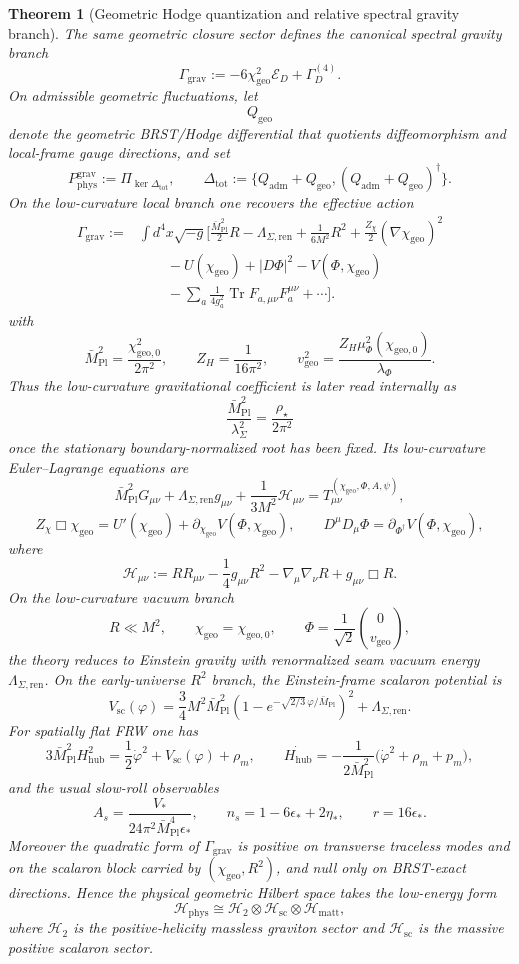 \documentclass[11pt,a4paper]{article}
\newtheorem{theorem}{Theorem}[section]
\theoremstyle{definition}
\theoremstyle{remark}
\DeclareMathOperator{\tr}{Tr}
\newcommand{\Seam}{\Sigma}
\newcommand{\Mpl}{\bar M_{\mathrm{Pl}}}
\newcommand{\Hhub}{H_{\mathrm{hub}}}
\newcommand{\chigeo}{\chi_{\mathrm{geo}}}
\newcommand{\chigeozero}{\chi_{\mathrm{geo},0}}
\newcommand{\vgeo}{v_{\mathrm{geo}}}
\begin{document}
\begin{theorem}[Geometric Hodge quantization and relative spectral gravity branch]
\label{thm:gravity-cosmology-closure}
The same geometric closure sector defines the canonical spectral gravity branch
\[
\Gamma_{\mathrm{grav}}
:=
-6\chigeo^2\mathcal E_D+\Gamma_D^{(4)}.
\]
On admissible geometric fluctuations, let
\[
Q_{\mathrm{geo}}
\]
denote the geometric BRST/Hodge differential that quotients diffeomorphism and local-frame gauge
directions, and set
\[
P_{\mathrm{phys}}^{\mathrm{grav}}
:=
\Pi_{\ker\Delta_{\mathrm{tot}}},
\qquad
\Delta_{\mathrm{tot}}
:=
\{Q_{\mathrm{adm}}+Q_{\mathrm{geo}},(Q_{\mathrm{adm}}+Q_{\mathrm{geo}})^\dagger\}.
\]
On the low-curvature local branch one recovers the effective action
\[
\begin{aligned}
\Gamma_{\mathrm{grav}}
:={}&
\int d^4x\sqrt{-g}\Big[
\frac{\Mpl^2}{2}R
-\Lambda_{\Seam,\mathrm{ren}}
+\frac{1}{6M^2}R^2
+\frac{Z_\chi}{2}(\nabla\chigeo)^2
\\
&\qquad
-U(\chigeo)
+|D\Phi|^2
-V(\Phi,\chigeo)
\\
&\qquad
-\sum_a \frac{1}{4g_a^2}\tr F_{a,\mu\nu}F_a^{\mu\nu}
+\cdots
\Big].
\end{aligned}
\]
with
\[
\Mpl^2=\frac{\chigeozero^2}{2\pi^2},
\qquad
Z_H=\frac{1}{16\pi^2},
\qquad
\vgeo^2=\frac{Z_H\mu_\Phi^2(\chigeozero)}{\lambda_\Phi}.
\]
Thus the low-curvature gravitational coefficient is later read internally as
\[
\frac{\Mpl^2}{\lambda_\Sigma^2}=\frac{\rho_\star}{2\pi^2}
\]
once the stationary boundary-normalized root has been fixed.
Its low-curvature Euler--Lagrange equations are
\[
\Mpl^2 G_{\mu\nu}
+\Lambda_{\Seam,\mathrm{ren}} g_{\mu\nu}
+\frac{1}{3M^2}\mathcal H_{\mu\nu}
=
T_{\mu\nu}^{(\chigeo,\Phi,A,\psi)},
\]
\[
Z_\chi\Box\chigeo=U'(\chigeo)+\partial_{\chigeo}V(\Phi,\chigeo),
\qquad
D^\mu D_\mu\Phi=\partial_{\Phi^\dagger}V(\Phi,\chigeo),
\]
where
\[
\mathcal H_{\mu\nu}
:=
RR_{\mu\nu}
-\frac14 g_{\mu\nu}R^2
-\nabla_\mu\nabla_\nu R
+g_{\mu\nu}\Box R.
\]
On the low-curvature vacuum branch
\[
R\ll M^2,
\qquad
\chigeo=\chigeozero,
\qquad
\Phi=\frac{1}{\sqrt2}\binom{0}{\vgeo},
\]
the theory reduces to Einstein gravity with renormalized seam vacuum energy $\Lambda_{\Seam,\mathrm{ren}}$.
On the early-universe $R^2$ branch, the Einstein-frame scalaron potential is
\[
V_{\mathrm{sc}}(\varphi)
=
\frac34 M^2\Mpl^2
\left(1-e^{-\sqrt{2/3}\,\varphi/\Mpl}\right)^2
+\Lambda_{\Seam,\mathrm{ren}}.
\]
For spatially flat FRW one has
\[
3\Mpl^2\Hhub^2
=
\frac12\dot\varphi^2+V_{\mathrm{sc}}(\varphi)+\rho_m,
\qquad
\dot{\Hhub}
=
-\frac{1}{2\Mpl^2}\bigl(\dot\varphi^2+\rho_m+p_m\bigr),
\]
and the usual slow-roll observables
\[
A_s=\frac{V_*}{24\pi^2\Mpl^4\epsilon_*},
\qquad
n_s=1-6\epsilon_*+2\eta_*,
\qquad
r=16\epsilon_*.
\]
Moreover the quadratic form of $\Gamma_{\mathrm{grav}}$ is positive on transverse traceless modes
and on the scalaron block carried by $(\chigeo,R^2)$, and null only on BRST-exact directions.
Hence the physical geometric Hilbert space takes the low-energy form
\[
\mathcal H_{\mathrm{phys}}
\cong
\mathcal H_{2}\otimes\mathcal H_{\mathrm{sc}}\otimes\mathcal H_{\mathrm{matt}},
\]
where $\mathcal H_{2}$ is the positive-helicity massless graviton sector and
$\mathcal H_{\mathrm{sc}}$ is the massive positive scalaron sector.
\end{theorem}
\end{document}
